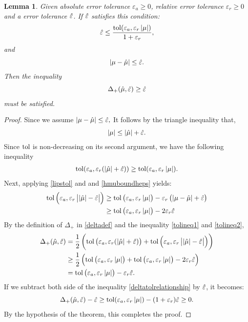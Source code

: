 \documentclass{iitthesis}
\newtheorem{lemma}[theorem]{Lemma}
\theoremstyle{definition}
\begin{document}
\begin{lemma}\label{cost2}
Given absolute error tolerance $\varepsilon_a \geq 0$, relative error tolerance $\varepsilon_r \geq 0$ and a error tolerance $\hat{\varepsilon}$. If $\hat{\varepsilon}$ satisfies this condition: $$ \hat{\varepsilon} \leq \frac{\operatorname{tol}(\varepsilon_a, \varepsilon_r\left \lvert \mu \right \rvert)}{1+\varepsilon_r}, $$ and 
\begin{equation}\label{hmuboundheps}
\left \lvert \mu -\hat{\mu} \right \rvert\leq \hat{\varepsilon}.
\end{equation}
Then the inequality $$\Delta_{+}(\hat{\mu},\hat{\varepsilon})\geq \hat{\varepsilon}$$ must be satisfied.
\end{lemma}
\begin{proof}
Since we assume $\left \lvert \mu -\hat{\mu} \right \rvert\leq \hat{\varepsilon},$ It follows by the triangle inequality that,
 $$\left \lvert \mu \right \rvert \leq\left \lvert \hat{\mu} \right \rvert+\hat{\varepsilon}.$$
Since $\operatorname{tol}$ is non-decreasing on its second argument, we have the following inequality
\begin{align}\label{tolineq1}
\operatorname{tol}(\varepsilon_a, \varepsilon_r (\left \lvert \hat{\mu} \right \rvert+\hat{\varepsilon}))  \geq \operatorname{tol}(\varepsilon_a, \varepsilon_r \left \lvert \mu \right \rvert).
\end{align}
Next, applying \eqref{lipstol} and and \eqref{hmuboundheps} yields:
\begin{align}
\operatorname{tol}\left(\varepsilon_a, \varepsilon_r \left \lvert \left \lvert \hat{\mu} \right \rvert-\hat{\varepsilon} \right \rvert\right)  
 &\geq \operatorname{tol}\left(\varepsilon_a, \varepsilon_r \left \lvert \mu \right \rvert\right) - \varepsilon_r\left(\left \lvert \mu-\hat{\mu} \right \rvert+\hat{\varepsilon}\right) \nonumber\\&
 \geq  \operatorname{tol}\left(\varepsilon_a, \varepsilon_r \left \lvert \mu \right \rvert\right) - 2\varepsilon_r\hat{\varepsilon} \label{tolineq2}
\end{align}
By the definition of $\Delta_{+}$ in \eqref{deltadef} and the inequality \eqref{tolineq1} and \eqref{tolineq2},
 \begin{align}
\Delta_{+}(\hat{\mu}, \hat{\varepsilon}) &= \frac{1}{2} \left ( \operatorname{tol}\left(\varepsilon_a, \varepsilon_r (\left \lvert \hat{\mu} \right \rvert+\hat{\varepsilon})\right) +\operatorname{tol}\left(\varepsilon_a, \varepsilon_r \left \lvert \left \lvert \hat{\mu} \right \rvert-\hat{\varepsilon} \right \rvert\right) \right) \nonumber\\&
\geq \frac{1}{2} \left( \operatorname{tol}\left(\varepsilon_a,\varepsilon_r \left \lvert \mu \right \rvert\right) + \operatorname{tol}\left(\varepsilon_a, \varepsilon_r \left \lvert \mu \right \rvert\right) - 2\varepsilon_r\hat{\varepsilon} \right)\nonumber\\& =  \operatorname{tol}\left(\varepsilon_a, \varepsilon_r \left \lvert \mu \right \rvert\right) - \varepsilon_r\hat{\varepsilon}.\label{deltatolrelationship}
\end{align}
If we subtract both side of the inequality \eqref{deltatolrelationship} by $\hat{\varepsilon}$, it becomes:
$$\Delta_{+}(\hat{\mu}, \hat{\varepsilon}) -\hat{\varepsilon} \geq \operatorname{tol}(\varepsilon_a,\varepsilon_r \left \lvert \mu \right \rvert)-(1+\varepsilon_r)\hat{\varepsilon} \geq 0.$$
By the hypothesis of the theorem, this completes the proof.
\end{proof}
\end{document}
